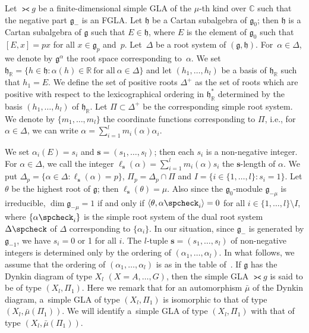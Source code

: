 Let $\gla g$ be a f\/inite-dimensional simple GLA of the $\mu$-th kind over
$\mathbb C$ such that the negative part $\mathfrak g_-$ is an FGLA.
Let $\mathfrak h$ be a Cartan subalgebra of $\mathfrak g_0$;
then $\mathfrak h$ is a Cartan subalgebra of $\mathfrak g$ such that
$E\in \mathfrak h$, where
$E$ is  the element of $\mathfrak g_0$ such that
$[E,x]=px$ for all $x\in\mathfrak g_p$ and~$p$.
Let~$\Delta$ be
a root system of $(\mathfrak g,\mathfrak h)$. For~$\alpha\in\Delta$,
we denote by $\mathfrak g^{\alpha}$ the root space corresponding to~$\alpha$. We set
$\mathfrak h_\mathbb R=\{ h\in\mathfrak h:\alpha(h)\in\mathbb R\ \text{for all}\ \alpha\in \Delta \}$
and let $(h_1,\dots,h_l)$ be a basis of $\mathfrak h_\mathbb R$ such that
$h_1=E$.
We def\/ine the set of positive roots $\Delta^+$ as the set of roots
which are positive with respect to the lexicographical ordering
in $\mathfrak h_{\mathbb R}^*$ determined by the basis $(h_1,\dots,h_l)$ of
$\mathfrak h_{\mathbb R}$.
Let $\Pi\subset \Delta^+$ be the corresponding simple root system.
We denote by $\{m_1,\dots,m_l\}$ the coordinate functions
corresponding to $\Pi$, i.e., for $\alpha\in\Delta$,
we can write $\alpha=\sum\limits_{i=1}^l m_i(\alpha)\alpha_i$.

We set $\alpha_i(E)=s_i$ and $\bm s=(s_1,\dots,s_l)$;
then each $s_i$ is a non-negative integer.
For $\alpha\in\Delta$, we call the integer
$\ell_{\bm s}(\alpha)=\sum\limits_{i=1}^l m_i(\alpha)s_i$ the
$\bm s$-length of $\alpha$.
We put $\Delta_p=\{ \alpha\in\Delta: \ell_{\bm s}(\alpha)=p \}$,
$\Pi_p=\Delta_p\cap \Pi$ and $I=\{ i\in\{1,\dots,l\}: s_i=1 \}$.
Let $\theta$ be the highest root of $\mathfrak g$; then
$\ell_{\bm s}(\theta)=\mu$. Also since the $\mathfrak g_0$-module
$\mathfrak g_{-\mu}$ is irreducible,
$\dim \mathfrak g_{-\mu}=1$
if and only if $\langle \theta,\alpha\spcheck_i\rangle=0$ for all
$i\in\{1,\dots,l\}\setminus I$, where $\{\alpha\spcheck_i\}$ is the simple root system of the dual root system $\Delta\spcheck$ of $\Delta$ corresponding
to $\{\alpha_i\}$.
In our situation, since $\mathfrak g_-$ is generated by
$\mathfrak g_{-1}$, we have $s_i=0$ or 1 for all $i$.
The $l$-tuple $\bm s=(s_1,\dots,s_l)$ of non-negative integers
is determined only by the ordering of $(\alpha_1,\dots,\alpha_l)$.
In what follows, we assume that the ordering of
$(\alpha_1,\dots,\alpha_l)$ is as in the table of~\cite{bou68:1}.
If $\mathfrak g$ has the Dynkin diagram of type $X_l$ $(X=A,\dots,G)$,
then the simple GLA $\gla g$
is said to be of type $(X_l,\Pi_1)$.
Here we remark that for an automorphism $\bar{\mu}$ of the
Dynkin diagram, a~simple GLA of type $(X_l,\Pi_1)$
is isomorphic to that of type $(X_l,\bar{\mu}(\Pi_1))$.
We will identify a~simple GLA of type $(X_l,\Pi_1)$
with that of type $(X_l,\bar{\mu}(\Pi_1))$.

